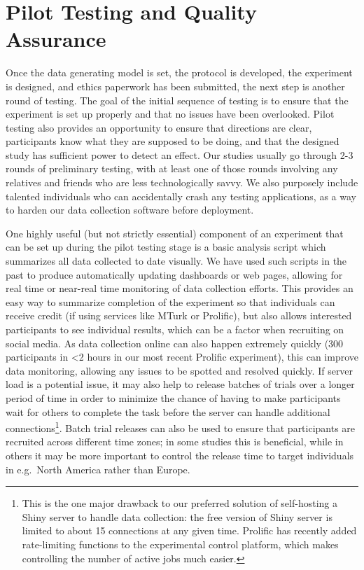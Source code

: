 \documentclass[
  10pt,
]{article}
\begin{document}
\section{Pilot Testing and Quality Assurance}\label{sec-pilot-test}

Once the data generating model is set, the protocol is developed, the
experiment is designed, and ethics paperwork has been submitted, the
next step is another round of testing. The goal of the initial sequence
of testing is to ensure that the experiment is set up properly and that
no issues have been overlooked. Pilot testing also provides an
opportunity to ensure that directions are clear, participants know what
they are supposed to be doing, and that the designed study has
sufficient power to detect an effect. Our studies usually go through 2-3
rounds of preliminary testing, with at least one of those rounds
involving any relatives and friends who are less technologically savvy.
We also purposely include talented individuals who can accidentally
crash any testing applications, as a way to harden our data collection
software before deployment.

One highly useful (but not strictly essential) component of an
experiment that can be set up during the pilot testing stage is a basic
analysis script which summarizes all data collected to date visually. We
have used such scripts in the past to produce automatically updating
dashboards or web pages, allowing for real time or near-real time
monitoring of data collection efforts. This provides an easy way to
summarize completion of the experiment so that individuals can receive
credit (if using services like MTurk or Prolific), but also allows
interested participants to see individual results, which can be a factor
when recruiting on social media. As data collection online can also
happen extremely quickly (300 participants in \textless2 hours in our
most recent Prolific experiment), this can improve data monitoring,
allowing any issues to be spotted and resolved quickly. If server load
is a potential issue, it may also help to release batches of trials over
a longer period of time in order to minimize the chance of having to
make participants wait for others to complete the task before the server
can handle additional connections\footnote{This is the one major
  drawback to our preferred solution of self-hosting a Shiny server to
  handle data collection: the free version of Shiny server is limited to
  about 15 connections at any given time. Prolific has recently added
  rate-limiting functions to the experimental control platform, which
  makes controlling the number of active jobs much easier.}. Batch trial
releases can also be used to ensure that participants are recruited
across different time zones; in some studies this is beneficial, while
in others it may be more important to control the release time to target
individuals in e.g.~North America rather than Europe.
\end{document}
